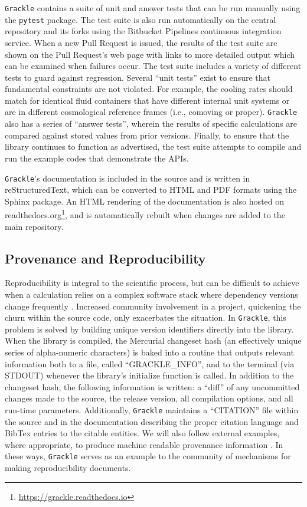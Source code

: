 \documentclass[11pt]{article}
\newcommand{\grackle}{\texttt{Grackle}}
\begin{document}
\begin{flushleft}
\grackle{} contains a suite of unit and answer
tests that can be run manually using the \texttt{pytest} package.  The
test suite is also run automatically on the central repository and its
forks using the Bitbucket Pipelines continuous integration service.
When a new Pull Request is issued, the results of the test suite are
shown on the Pull Request's web page with links to more detailed
output which can be examined when failures occur.  The test suite
includes a variety of different tests to guard against regression.
Several ``unit tests'' exist to ensure that fundamental
constraints are not violated.  For example, the cooling rates should
match for identical fluid containers that have different internal unit
systems or are in different cosmological reference frames (i.e.,
comoving or proper).  \grackle{} also has a series of ``answer
tests'', wherein the results of specific calculations are compared
against stored values from prior versions.  Finally, to ensure that
the library continues to function as advertised, the test suite
attempts to compile and run the example codes that demonstrate the
APIs.

\grackle{}'s documentation is included in the source and is written in
reStructuredText, which can be converted to HTML and PDF formats
using the Sphinx package.  An HTML rendering of the documentation is
also hosted on
readthedocs.org\footnote{\url{https://grackle.readthedocs.io}},
and is automatically rebuilt when changes are added to the main
repository.

\subsection{Provenance and Reproducibility}

Reproducibility is integral to the scientific process, but can be
difficult to achieve when a calculation relies on a complex software
stack where dependency versions change frequently
\citep{2014arXiv1412.5557J, 2016arXiv161009958L}.  Increased
community involvement in a project, quickening the churn within the
source code, only exacerbates the situation.  In \grackle{}, this
problem is solved by building unique version identifiers directly
into the library.  When the library is compiled, the Mercurial
changeset hash (an effectively unique series of alpha-numeric
characters) is baked into a routine that outputs relevant information
both to a file, called ``GRACKLE\_INFO'', and to the terminal (via
STDOUT) whenever the library's initialize function is called.  In
addition to the changeset hash, the following information is written:
a ``diff'' of any uncommitted changes made to the source, the release
version, all compilation options, and all run-time parameters.
Additionally, \grackle{} maintains a ``CITATION'' file within the
source and in the documentation describing the proper citation
language and BibTex entries to the citable entities.  We will also
follow external examples, where appropriate, to produce machine
readable provenance information \citep[e.g.,][]{force11,
  Fenner097196}.  In these ways, \grackle{} serves as an example to
the community of mechanisms for making reproducibility documents.


\end{flushleft}
\end{document}
